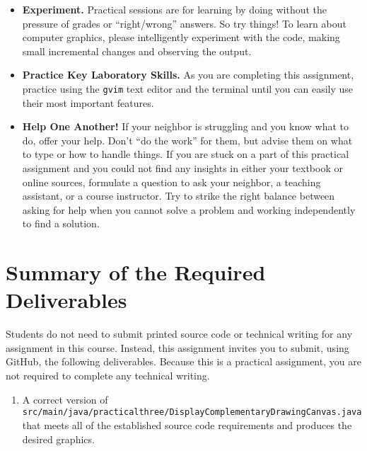 \documentclass[11pt]{article}
\newcommand{\mainprogramsource}{\lstinline{src/main/java/practicalthree/DisplayComplementaryDrawingCanvas.java}}
\begin{document}
\vspace*{-.05in}
\begin{itemize}

\itemsep 0in

\item {\bf Experiment.} Practical sessions are for learning by doing without the
  pressure of grades or ``right/wrong'' answers. So try things! To learn about
  computer graphics, please intelligently experiment with the code, making small
  incremental changes and observing the output.

\item {\bf Practice Key Laboratory Skills.} As you are completing this
  assignment, practice using the {\tt gvim} text editor and the terminal until
  you can easily use their most important features.

\item {\bf Help One Another!} If your neighbor is struggling and you know what
  to do, offer your help. Don't ``do the work'' for them, but advise them on
  what to type or how to handle things. If you are stuck on a part of this
  practical assignment and you could not find any insights in either your
  textbook or online sources, formulate a question to ask your neighbor, a
  teaching assistant, or a course instructor. Try to strike the right balance
  between asking for help when you cannot solve a problem and working
  independently to find a solution.

\end{itemize}

\section*{Summary of the Required Deliverables}

\noindent Students do not need to submit printed source code or technical
writing for any assignment in this course. Instead, this assignment invites you
to submit, using GitHub, the following deliverables. Because this is a practical
assignment, you are not required to complete any technical writing.

\begin{enumerate}

\setlength{\itemsep}{0in}

\item A correct version of \mainprogramsource{} that meets all of the
  established source code requirements and produces the desired graphics.

\end{enumerate}
\end{document}
